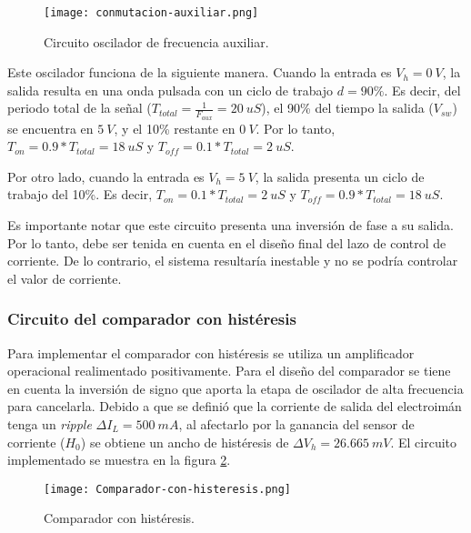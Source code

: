 \begin{figure}[H]
	\centering
	\texttt{[image: conmutacion-auxiliar.png]}
	\caption{Circuito oscilador de frecuencia auxiliar.}
	\label{fig:img_frecuencia-auxiliar}
\end{figure}


%
%

Este oscilador funciona de la siguiente manera. Cuando la entrada es $V_h=0\:V$, la salida resulta en una onda pulsada con un  ciclo de trabajo $d=90\%$. Es decir, del periodo total de la señal ($T_{total}=\frac{1}{F_{aux}}=20\:uS$), el 90\% del tiempo la salida ($V_{sw}$) se encuentra en $5\:V$, y el 10\% restante en $0\:V$. Por lo tanto, $T_{on}=0.9*T_{total}=18\:uS$ y $T_{off}=0.1*T_{total}=2\:uS$.

Por otro lado, cuando la entrada es $V_h=5\:V$, la salida presenta un ciclo de trabajo del 10\%. Es decir, $T_{on}=0.1*T_{total}=2\:uS$ y $T_{off}=0.9*T_{total}=18\:uS$.

Es importante notar que este circuito presenta una inversión de fase a su salida. Por lo tanto, debe ser tenida en cuenta en el diseño final del lazo de control de corriente. De lo contrario, el sistema resultaría inestable y no se podría controlar el valor de corriente.

\subsubsection{Circuito del comparador con histéresis}

Para implementar el comparador con histéresis se utiliza un amplificador operacional realimentado positivamente. Para el diseño del comparador se tiene en cuenta la inversión de signo que aporta la etapa de oscilador de alta frecuencia para cancelarla. Debido a que se definió que la corriente de salida del electroimán tenga un \textsl{ripple} $\Delta I_L=500\:mA$, al afectarlo por la ganancia del sensor de corriente ($H_0$) se obtiene un ancho de histéresis de $\Delta V_h=26.665\:mV$. El circuito implementado se muestra en la figura \ref{fig:img_comp-con-hist}.

\begin{figure}[H]
	\centering
	\texttt{[image: Comparador-con-histeresis.png]}
	\caption{Comparador con histéresis.}
	\label{fig:img_comp-con-hist}
\end{figure}


